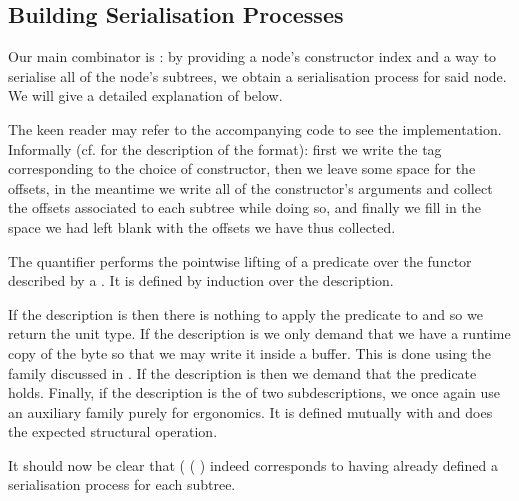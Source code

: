 \subsection{Building Serialisation Processes}\label{sec:serialnode}

Our main combinator is \IdrisFunction{(\#)}: by providing
a node's constructor index
and a way to serialise all of the node's subtrees,
we obtain a serialisation process for said node.
%
We will give a detailed explanation of  below.


The keen reader may refer to the accompanying code to see the implementation.
Informally (cf.  for the description of the format):
first we write the tag corresponding to the choice of constructor,
then we leave some space for the offsets,
in the meantime we write all of the constructor's arguments and collect the offsets
associated to each subtree while doing so,
and finally we fill in the space we had left blank with the offsets
we have thus collected.

The  quantifier performs the pointwise lifting of a predicate over
the functor described by a . It is defined by induction over
the description.


If the description is  then there is nothing to apply
the predicate to and so we return the unit type.
%
If the description is  we only demand that we have a runtime
copy of the byte so that we may write it inside a buffer. This is done using
the  family discussed in .
%
If the description is  then we demand that the
predicate holds.
%
Finally, if the description is the  of two subdescriptions, we once
again use an auxiliary family purely for ergonomics. It is defined mutually
with  and does the expected structural operation.


It should now be clear that
( \IdrisKeyword{(} \IdrisKeyword{)}
( \IdrisKeyword{)}) indeed corresponds
to having already defined a serialisation process for each subtree.

